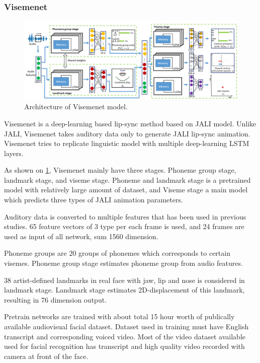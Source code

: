 \documentclass[10pt,twocolumn,letterpaper]{article}
\begin{document}
\subsubsection{Visemenet}

\begin{figure}
   \centering
   \includegraphics[width=1.0\linewidth]{VisemenetArchitecture}
   \caption{Architecture of Visemenet model.}
   \label{fig:VisemenetArchitecture}
\end{figure}



Visemenet is a deep-learning based lip-sync method based on JALI model. Unlike JALI, Visemenet takes auditory data only to generate JALI lip-sync animation. Visemenet tries to replicate linguistic model with multiple deep-learning LSTM layers.

As shown on \cref{fig:VisemenetArchitecture}, Visemenet mainly have three stages. Phoneme group stage, landmark stage, and viseme stage. Phoneme and landmark stage is a pretrained model with relatively large amount of dataset, and Viseme stage a main model which predicts three types of JALI animation parameters.

Auditory data is converted to multiple features that has been used in previous studies. 65 feature vectors of 3 type per each frame is used, and 24 frames are used as input of all network, sum 1560 dimension.

Phoneme groups are 20 groups of phonemes which corresponds to certain visemes. Phoneme group stage estimates phoneme group from audio features.

38 artist-defined landmarks in real face with jaw, lip and nose is considered in landmark stage. Landmark stage estimates 2D-displacement of this landmark, resulting in 76 dimension output.

Pretrain networks are trained with about total 15 hour worth of publically available audiovisual facial dataset. Dataset used in training must have English transcript and corresponding voiced video. Most of the video dataset available used for facial recognition has transcript and high quality video recorded with camera at front of the face.
\end{document}
